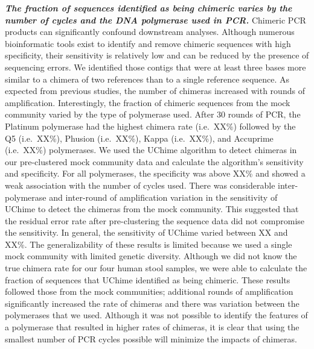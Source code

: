 \documentclass[11pt,]{article}
\begin{document}
\textbf{\emph{The fraction of sequences identified as being chimeric
varies by the number of cycles and the DNA polymerase used in PCR.}}
Chimeric PCR products can significantly confound downstream analyses.
Although numerous bioinformatic tools exist to identify and remove
chimeric sequences with high specificity, their sensitivity is
relatively low and can be reduced by the presence of sequencing errors.
We identified those contigs that were at least three bases more similar
to a chimera of two references than to a single reference sequence. As
expected from previous studies, the number of chimeras increased with
rounds of amplification. Interestingly, the fraction of chimeric
sequences from the mock community varied by the type of polymerase used.
After 30 rounds of PCR, the Platinum polymerase had the highest chimera
rate (i.e.~XX\%) followed by the Q5 (i.e.~XX\%), Phusion (i.e.~XX\%),
Kappa (i.e.~XX\%), and Accuprime (i.e.~XX\%) polymerases. We used the
UChime algorithm to detect chimeras in our pre-clustered mock community
data and calculate the algorithm's sensitivity and specificity. For all
polymerases, the specificity was above XX\% and showed a weak
association with the number of cycles used. There was considerable
inter-polymerase and inter-round of amplification variation in the
sensitivity of UChime to detect the chimeras from the mock community.
This suggested that the residual error rate after pre-clustering the
sequence data did not compromise the sensitivity. In general, the
sensitivity of UChime varied between XX and XX\%. The generalizability
of these results is limited because we used a single mock community with
limited genetic diversity. Although we did not know the true chimera
rate for our four human stool samples, we were able to calculate the
fraction of sequences that UChime identified as being chimeric. These
results followed those from the mock communities; additional rounds of
amplification significantly increased the rate of chimeras and there was
variation between the polymerases that we used. Although it was not
possible to identify the features of a polymerase that resulted in
higher rates of chimeras, it is clear that using the smallest number of
PCR cycles possible will minimize the impacts of chimeras.
\end{document}
